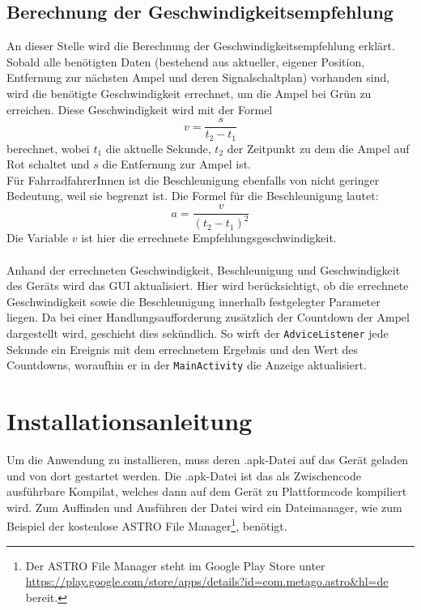\subsection{Berechnung der Geschwindigkeitsempfehlung}
An dieser Stelle wird die Berechnung der Geschwindigkeitsempfehlung erklärt. Sobald alle benötigten Daten (bestehend aus aktueller, eigener Position, Entfernung zur nächsten Ampel und deren Signalschaltplan) vorhanden sind, wird die benötigte Geschwindigkeit errechnet, um die Ampel bei Grün zu erreichen. Diese Geschwindigkeit wird mit der Formel 
\[ v = \frac{s}{t_{2} - t_{1}} \]
berechnet, wobei $t_1$ die aktuelle Sekunde, $t_2$ der Zeitpunkt zu dem die Ampel auf Rot schaltet und $s$ die Entfernung zur Ampel ist. \\
Für FahrradfahrerInnen ist die Beschleunigung ebenfalls von nicht geringer Bedeutung, weil sie begrenzt ist. Die Formel für die Beschleunigung lautet:
\[ a = \frac{v}{(t_{2} - t_{1})^{2}} \] 
Die Variable $v$ ist hier die errechnete Empfehlungsgeschwindigkeit.\\\\
Anhand der errechneten Geschwindigkeit, Beschleunigung und Geschwindigkeit des Geräts wird das \gls{GUI} aktualisiert. Hier wird berücksichtigt, ob die errechnete Geschwindigkeit sowie die Beschleunigung innerhalb festgelegter Parameter liegen. Da bei einer Handlungsaufforderung zusätzlich der Countdown der Ampel dargestellt wird, geschieht dies sekündlich. So wirft der \texttt{AdviceListener} jede Sekunde ein Ereignis mit dem errechnetem Ergebnis und den Wert des Countdowns, woraufhin er in der \texttt{MainActivity} die Anzeige aktualisiert.
%
%
\section{Installationsanleitung}
Um die Anwendung zu installieren, muss deren .apk-Datei auf das Gerät geladen und von dort gestartet werden. Die .apk-Datei ist das als Zwischencode ausführbare Kompilat, welches dann auf dem Gerät zu Plattformcode kompiliert wird. Zum Auffinden und Ausführen der Datei wird ein Dateimanager, wie zum Beispiel der kostenlose ASTRO File Manager\footnote{ Der ASTRO File Manager steht im Google Play Store unter \url{https://play.google.com/store/apps/details?id=com.metago.astro&hl=de} bereit.},  benötigt. 
